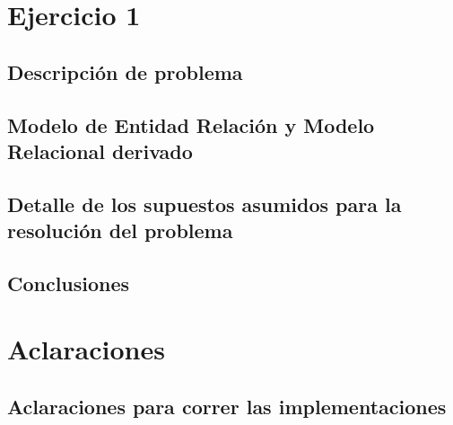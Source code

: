 \documentclass[12pt, a4paper]{article}
\begin{document}
\maketitle
\tableofcontents
\newpage

\newpage
\section{Ejercicio 1} 
\subsection{Descripci\'on de problema}

\subsection{Modelo de Entidad Relación y Modelo Relacional derivado}

\subsection{Detalle de los supuestos asumidos para la resolución del problema}

\subsection{Conclusiones}


\newpage
\section{Aclaraciones} 
\subsection{Aclaraciones para correr las implementaciones}

\end{document}
